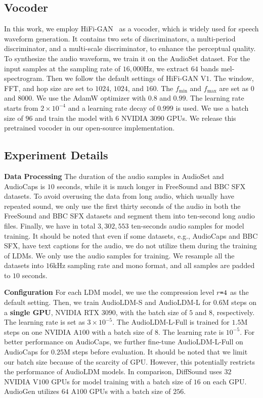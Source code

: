 \documentclass{article}
\begin{document}
\subsection{Vocoder}
\label{app:HiFi-GAN}

In this work, we employ HiFi-GAN~\cite{kong2020hifi} as a vocoder, which is widely used for speech waveform generation. It contains two sets of discriminators, a multi-period discriminator, and a multi-scale discriminator, to enhance the perceptual quality. To synthesize the audio waveform, we train it on the AudioSet dataset. For the input samples at the sampling rate of $16,000$Hz, we extract $64$ bands mel-spectrogram. Then we follow the default settings of HiFi-GAN V$1$. The window, FFT, and hop size are set to $1024$, $1024$, and $160$. The $f_{\text{min}}$ and $f_{\text{max}}$ are set as $0$ and $8000$. We use the AdamW optimizer with $0.8$ and $0.99$. The learning rate starts from $2\times 10^{-4}$ and a learning rate decay of $0.999$ is used. We use a batch size of $96$ and train the model with $6$ NVIDIA $3090$ GPUs. We release this pretrained vocoder in our open-source implementation.

\subsection{Experiment Details}
\label{app:TrainingDetails}

\textbf{Data Processing} The duration of the audio samples in AudioSet and AudioCaps is $10$ seconds, while it is much longer in FreeSound and BBC SFX datasets. To avoid overusing the data from long audio, which usually have repeated sound, we only use the first thirty seconds of the audio in both the FreeSound and BBC SFX datasets and segment them into ten-second long audio files. Finally, we have in total $3,302,553$ ten-seconds audio samples for model training. It should be noted that even if some datasets, e.g., AudioCaps and BBC SFX, have text captions for the audio, we do not utilize them during the training of LDMs. We only use the audio samples for training. We resample all the datasets into $16$kHz sampling rate and mono format, and all samples are padded to $10$ seconds. 

\textbf{Configuration} For each LDM model, we use the compression level $r\texttt{=}4$ as the default setting. Then, we train AudioLDM-S and AudioLDM-L for $0.6$M steps on a \textbf{single GPU}, NVIDIA RTX $3090$, with the batch size of $5$ and $8$, respectively. The learning rate is set as $3\times 10^{-5}$. The AudioLDM-L-Full is trained for $1.5$M steps on one NVIDIA A$100$ with a batch size of $8$. The learning rate is $10^{-5}$. For better performance on AudioCaps, we further fine-tune AudioLDM-L-Full on AudioCaps for $0.25$M steps before evaluation. It should be noted that we limit our batch size because of the scarcity of GPU. However, this potentially restricts the performance of AudioLDM models. In comparison, DiffSound uses $32$ NVIDIA V$100$ GPUs for model training with a batch size of $16$ on each GPU. AudioGen utilizes $64$ A$100$ GPUs with a batch size of $256$. 
\end{document}
